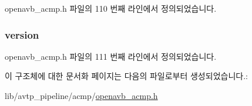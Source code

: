 openavb\+\_\+acmp.\+h 파일의 110 번째 라인에서 정의되었습니다.

\subsubsection[{\texorpdfstring{version}{version}}]{ version}\hypertarget{structopenavb__acmp__control__header__t_ae5d1ca2d5099c6a5f760c897505cb11b}{}\label{structopenavb__acmp__control__header__t_ae5d1ca2d5099c6a5f760c897505cb11b}


openavb\+\_\+acmp.\+h 파일의 111 번째 라인에서 정의되었습니다.



이 구조체에 대한 문서화 페이지는 다음의 파일로부터 생성되었습니다.\+:\begin{DoxyCompactItemize}
\item 
lib/avtp\+\_\+pipeline/acmp/\hyperlink{openavb__acmp_8h}{openavb\+\_\+acmp.\+h}\end{DoxyCompactItemize}
